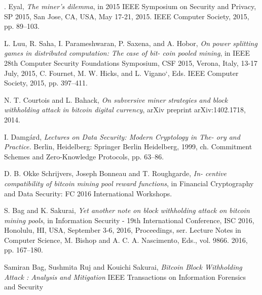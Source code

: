 \documentclass[12pt]{article}
\begin{document}
\begin{thebibliography}{9}
 . Eyal, 
 \textit{The miner’s dilemma}, in 2015 IEEE Symposium on Security and Privacy, SP 2015, San Jose, CA, USA, May 17-21, 2015. IEEE Computer Society, 2015, pp. 89–103.
 
 L. Luu, R. Saha, I. Parameshwaran, P. Saxena, and A. Hobor, 
 \textit{On power splitting games in distributed computation: The case of bit- coin pooled mining}, in IEEE 28th Computer Security Foundations Symposium, CSF 2015, Verona, Italy, 13-17 July, 2015, C. Fournet, M. W. Hicks, and L. Vigano`, Eds. IEEE Computer Society, 2015, pp. 397–411.
 
 N. T. Courtois and L. Bahack, 
 \textit{On subversive miner strategies and block withholding attack in bitcoin digital currency}, arXiv preprint arXiv:1402.1718, 2014.
 
 I. Damg{\'a}rd, 
 \textit{Lectures on Data Security: Modern Cryptology in The- ory and Practice.} Berlin, Heidelberg: Springer Berlin Heidelberg, 1999, ch. Commitment Schemes and Zero-Knowledge Protocols, pp. 63–86.
 
 D. B. Okke Schrijvers, Joseph Bonneau and T. Roughgarde, 
 \textit{In- centive compatibility of bitcoin mining pool reward functions}, in Financial Cryptography and Data Security: FC 2016 International Workshops.
 
 S. Bag and K. Sakurai, 
 \textit{Yet another note on block withholding attack on bitcoin mining pools}, in Information Security - 19th International Conference, ISC 2016, Honolulu, HI, USA, September 3-6, 2016, Proceedings, ser. Lecture Notes in Computer Science,
 M. Bishop and A. C. A. Nascimento, Eds., vol. 9866. 2016, pp. 167–180.
 
 Samiran Bag, Sushmita Ruj and Kouichi Sakurai,
\textit{Bitcoin Block Withholding Attack : Analysis and
Mitigation}
IEEE Transactions on Information Forensics and Security
\end{thebibliography}
\end{document}
